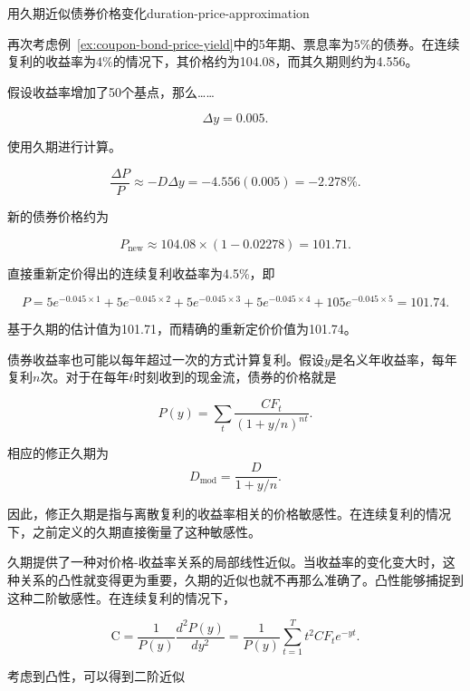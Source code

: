 \begin{example}{用久期近似债券价格变化}{duration-price-approximation}

再次考虑例~\ref{ex:coupon-bond-price-yield}中的5年期、票息率为5\%的债券。在连续复利的收益率为4\%的情况下，其价格约为104.08，而其久期则约为4.556。

假设收益率增加了50个基点，那么……

\[
\Delta y=0.005.
\]

使用久期进行计算。

\[
\frac{\Delta P}{P}
\approx
-D\Delta y
=
-4.556(0.005)
=
-2.278\%.
\]

新的债券价格约为

\[
P_{\mathrm{new}}
\approx
104.08\times(1-0.02278)
=
101.71.
\]

直接重新定价得出的连续复利收益率为4.5\%，即

\[
P
=
5e^{-0.045\times1}
+
5e^{-0.045\times2}
+
5e^{-0.045\times3}
+
5e^{-0.045\times4}
+
105e^{-0.045\times5}
=
101.74.
\]

基于久期的估计值为101.71，而精确的重新定价价值为101.74。

\end{example}

债券收益率也可能以每年超过一次的方式计算复利。假设$y$是名义年收益率，每年复利$n$次。对于在每年$t$时刻收到的现金流，债券的价格就是

\begin{equation}
P(y)
=
\sum_{t}
\frac{CF_t}{(1+y/n)^{nt}}.
\label{eq:ch8-bond-price-n-compounding}
\end{equation}

相应的修正久期为 
\begin{equation}
D_{\mathrm{mod}}
=
\frac{D}{1+y/n}.
\label{eq:ch8-modified-duration-relation}
\end{equation}

因此，修正久期是指与离散复利的收益率相关的价格敏感性。在连续复利的情况下，之前定义的久期直接衡量了这种敏感性。

久期提供了一种对价格-收益率关系的局部线性近似。当收益率的变化变大时，这种关系的凸性就变得更为重要，久期的近似也就不再那么准确了。凸性能够捕捉到这种二阶敏感性。在连续复利的情况下，

\begin{equation}
\mathrm{C}
=
\frac{1}{P(y)}
\frac{d^2P(y)}{dy^2}
=
\frac{1}{P(y)}
\sum_{t=1}^{T}
t^2 CF_t e^{-yt}.
\label{eq:ch8-convexity}
\end{equation}

考虑到凸性，可以得到二阶近似

